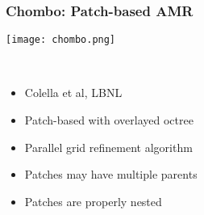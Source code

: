 \begin{frame}[fragile] \frametitle{Chombo: Patch-based AMR}
\begin{minipage}{1.4in}
\centerline{\texttt{[image: chombo.png]}}
\end{minipage} \ 
\begin{minipage}{2.6in}
\begin{itemize}
\item Colella et al, LBNL
\item Patch-based with overlayed octree
\item Parallel grid refinement algorithm
\item Patches may have multiple parents
\item Patches are properly nested
\end{itemize}
\end{minipage}
\end{frame}
